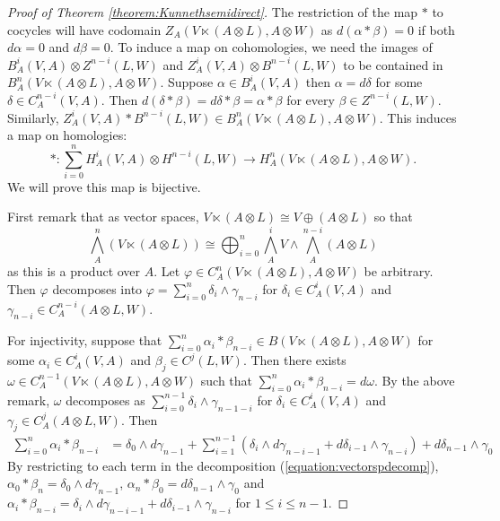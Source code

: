 \documentclass[10pt,a4paper]{amsart}
\newcommand{\vphi}{{\varphi}}
\begin{document}
\begin{proof}[Proof of Theorem \ref{theorem:Kunnethsemidirect}]
The restriction of the map $\ast$ to cocycles will have codomain $Z_A(V\ltimes (A \otimes L), A \otimes W)$ as $d(\alpha \ast \beta) =0$ if both $d\alpha =0$ and $d\beta =0$. To induce a map on cohomologies, we need the images of $B_A^i(V, A) \otimes Z^{n-i}(L,W)$ and $Z_A^i(V,A) \otimes B^{n-i}(L,W)$ to be contained in $B_A^n(V \ltimes (A \otimes L), A \otimes W)$. Suppose $\alpha \in B_A^i(V,A)$ then $\alpha = d\delta$ for some $\delta \in C_A^{n-i}(V, A)$. Then $d(\delta \ast \beta) = d\delta \ast \beta= \alpha \ast \beta$ for every $\beta \in Z^{n-i}(L, W)$. Similarly, $Z_A^i(V, A) \ast B^{n-i}(L,W) \in B^n_A(V \ltimes(A \otimes L), A \otimes W)$.  This induces a map on homologies:
\[
\ast: \sum_{i=0}^n H_A^i(V, A) \otimes H^{n-i}(L, W) \rightarrow H_A^{n}(V \ltimes (A \otimes L), A \otimes W).
\]
We will prove this map is bijective. 

First remark that as vector spaces, $V \ltimes (A \otimes L) \cong V \oplus (A \otimes L)$ so that 
\begin{equation}\label{equation:vectorspdecomp}
\bigwedge_A^n(V \ltimes (A \otimes L)) \cong \bigoplus_{i=0}^n \bigwedge_A^i V \wedge \bigwedge_A^{n-i} (A \otimes L)
\end{equation}
as this is a product over $A$. Let $\vphi \in C^n_A(V \ltimes (A \otimes L), A \otimes W)$ be arbitrary. Then $\vphi$ decomposes into $\vphi = \sum_{i=0}^n \delta_i \wedge \gamma_{n-i}$ for  $\delta_i \in C_A^i(V, A)$ and $\gamma_{n-i} \in C_A^{n-i}(A \otimes L, W)$.

For injectivity, suppose that $\sum_{i=0}^n \alpha_i \ast \beta_{n-i} \in B(V \ltimes (A \otimes L), A \otimes W)$ for some $\alpha_i \in C^i_A(V, A)$ and $\beta_j \in C^j(L, W)$. Then there exists $\omega \in C^{n-1}_A(V \ltimes (A \otimes L), A \otimes W)$ such that $\sum_{i=0}^n \alpha_i \ast \beta_{n-i} = d \omega$. By the above remark, $\omega$ decomposes as  $\sum_{i=0}^{n-1} \delta_i \wedge \gamma_{n-1-i}$ for $\delta_i \in C_A^i(V, A)$ and $\gamma_{j}\in C_A^j(A\otimes L, W)$. Then
\begin{align*}
\sum_{i=0}^n \alpha_i \ast \beta_{n-i} & = \delta_0 \wedge d\gamma_{n-1} + \sum_{i=1}^{n-1} \left( \delta_{i} \wedge d\gamma_{n-i-1} +  d\delta_{i-1} \wedge \gamma_{n-i} \right) + d\delta_{n-1} \wedge \gamma_0 
\end{align*}
By restricting to each term in the decomposition (\ref{equation:vectorspdecomp}),  $\alpha_0 \ast \beta_{n} = \delta_0 \wedge d\gamma_{n-1}$,  $\alpha_n \ast \beta_0 = d\delta_{n-1} \wedge \gamma_0$ and  $\alpha_i \ast \beta_{n-i} = \delta_{i} \wedge d\gamma_{n-i-1} +  d\delta_{i-1} \wedge \gamma_{n-i}$ for $1 \leq i \leq n-1$. 


\end{proof}
\end{document}
